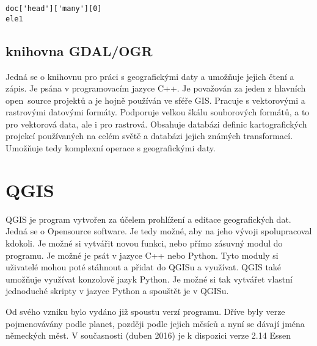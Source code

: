 {\scriptsize
\lstset{language=Python}
\begin{lstlisting}
doc['head']['many'][0]
ele1
\end{lstlisting}
}


\subsection{knihovna GDAL/OGR}
\label{GDAL/OGR}
Jedná se o knihovnu pro práci s geografickými daty a umožňuje jejich čtení a zápis.
Je psána v programovacím jazyce C++. Je považován za jeden z hlavních 
open~source projektů a je hojně používán ve sféře GIS. Pracuje s vektorovými a 
rastrovými datovými formáty. Podporuje velkou škálu souborových formátů, a to 
pro vektorová data, ale i pro rastrová. Obsahuje databázi definic kartografických
projekcí používaných na celém světě a databázi jejich známých transformací. 
Umožňuje tedy komplexní operace s geografickými daty. \cite{GDAL}


\section{QGIS}
\label{QGIS}
QGIS je program vytvořen za účelem prohlížení a editace geografických dat.
Jedná se o Opensource software. Je tedy možné, aby na jeho vývoji spolupracoval
kdokoli. Je možné si vytvářit novou funkci, nebo přímo zásuvný modul do programu.
Je možné je psát v jazyce C++ nebo Python.
Tyto moduly si uživatelé mohou poté stáhnout a přidat do QGISu a využívat.
QGIS také umožňuje využívat konzolově jazyk Python. Je možné si tak vytvářet
vlastní jednoduché skripty v jazyce Python a spouštět je v QGISu.

Od svého vzniku bylo vydáno již spoustu verzí programu.
Dříve byly verze pojmenovávány podle planet, později podle jejich měsíců a nyní se dávají
jména německých měst. V současnosti (duben 2016) je k dispozici verze 2.14 Essen

